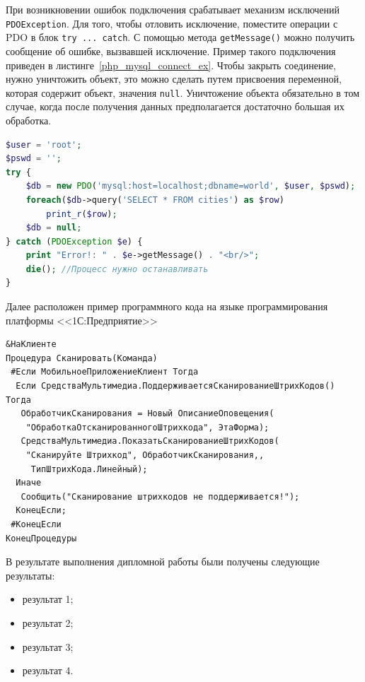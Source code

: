 \documentclass[14pt]{extarticle} %
\begin{document}
При возникновении ошибок подключения срабатывает механизм исключений \lstinline{PDOException}. Для того, чтобы отловить исключение, поместите операции с PDO в блок \lstinline{try ... catch}. С помощью метода \lstinline{getMessage()} можно получить сообщение об ошибке, вызвавшей исключение. Пример такого подключения приведен в листинге~\ref{php_mysql_connect_ex}.  Чтобы закрыть соединение, нужно уничтожить объект, это можно сделать путем присвоения переменной, которая содержит объект, значения \lstinline{null}. Уничтожение объекта обязательно в том случае, когда после получения данных предполагается достаточно большая их обработка.  

\begin{lstlisting}[language=PHP, caption={Установка соединения с базой данных}, label=php_mysql_connect_ex]
$user = 'root';
$pswd = '';
try {
	$db = new PDO('mysql:host=localhost;dbname=world', $user, $pswd);
	foreach($db->query('SELECT * FROM cities') as $row)
		print_r($row);
	$db = null;
} catch (PDOException $e) {
	print "Error!: " . $e->getMessage() . "<br/>";
	die(); //Процесс нужно останавливать
}
\end{lstlisting} 

Далее расположен пример программного кода на языке программирования платформы <<1С:Предприятие>>
\begin{lstlisting}[caption={Подключение механизма сканирования}, label=scaner]
&НаКлиенте
Процедура Сканировать(Команда)
 #Если МобильноеПриложениеКлиент Тогда
  Если СредстваМультимедиа.ПоддерживаетсяСканированиеШтрихКодов() Тогда
   ОбработчикСканирования = Новый ОписаниеОповещения(
    "ОбработкаОтсканированногоШтрихкода", ЭтаФорма);
   СредстваМультимедиа.ПоказатьСканированиеШтрихКодов(
    "Сканируйте Штрихкод", ОбработчикСканирования,,
     ТипШтрихКода.Линейный);
  Иначе
   Сообщить("Сканирование штрихкодов не поддерживается!");
  КонецЕсли;
 #КонецЕсли
КонецПроцедуры
\end{lstlisting}



В результате выполнения дипломной работы были получены следующие результаты:

\begin{itemize}
\item результат 1; 
\item результат 2;
\item результат 3;
\item результат 4.  
\end{itemize}
\end{document}
